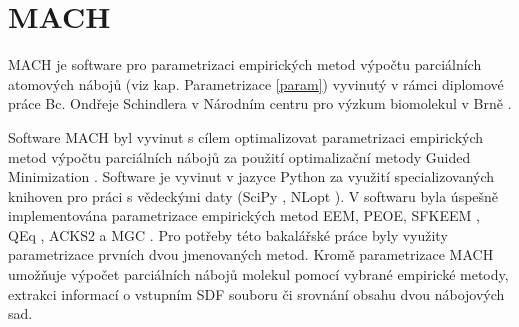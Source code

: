 \section{MACH}
MACH je software pro parametrizaci empirických metod výpočtu parciálních atomových nábojů (viz kap. Parametrizace \ref{param}) vyvinutý v rámci diplomové práce Bc. Ondřeje Schindlera v Národním centru pro výzkum biomolekul v Brně \cite{mach}. 

Software MACH byl vyvinut s cílem optimalizovat parametrizaci empirických metod výpočtu parciálních nábojů za použití optimalizační metody Guided Minimization \cite{guided_m}. Software je vyvinut v jazyce Python za využití specializovaných knihoven pro práci s vědeckými daty (SciPy \cite{scipy}, NLopt \cite{nlopt}). V softwaru byla úspešně implementována parametrizace empirických metod EEM, PEOE, SFKEEM \cite{sfkeem}, QEq \cite{molsimul}, ACKS2 \cite{acsk2} a MGC \cite{mgc}. Pro potřeby této bakalářské práce byly využity parametrizace prvních dvou jmenovaných metod. Kromě parametrizace MACH umožňuje výpočet parciálních nábojů molekul pomocí vybrané empirické metody, extrakci informací o vstupním SDF souboru či srovnání obsahu dvou nábojových sad.
